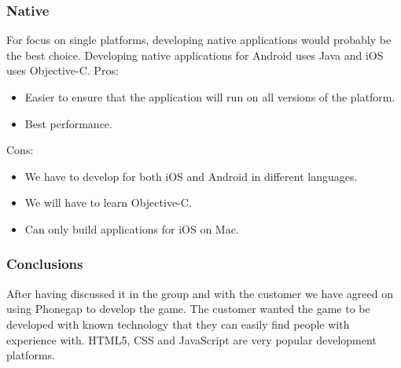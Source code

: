 \subsubsection{Native}
For focus on single platforms, developing native applications would probably be the best choice. Developing native applications for Android uses Java and iOS uses Objective-C.
\linebreak
Pros:
\begin{itemize}
  \item Easier to ensure that the application will run on all versions of the platform.
  \item Best performance.
\end{itemize}
Cons:
\begin{itemize}
  \item We have to develop for both iOS and Android in different languages.
  \item We will have to learn Objective-C.
  \item Can only build applications for iOS on Mac.
\end{itemize}
\linebreak
\subsubsection{Conclusions}
After having discussed it in the group and with the customer we have agreed on using Phonegap to develop the game. The customer wanted the game to be developed with known technology that they can easily find people with experience with. HTML5, CSS and JavaScript are very popular development platforms.

